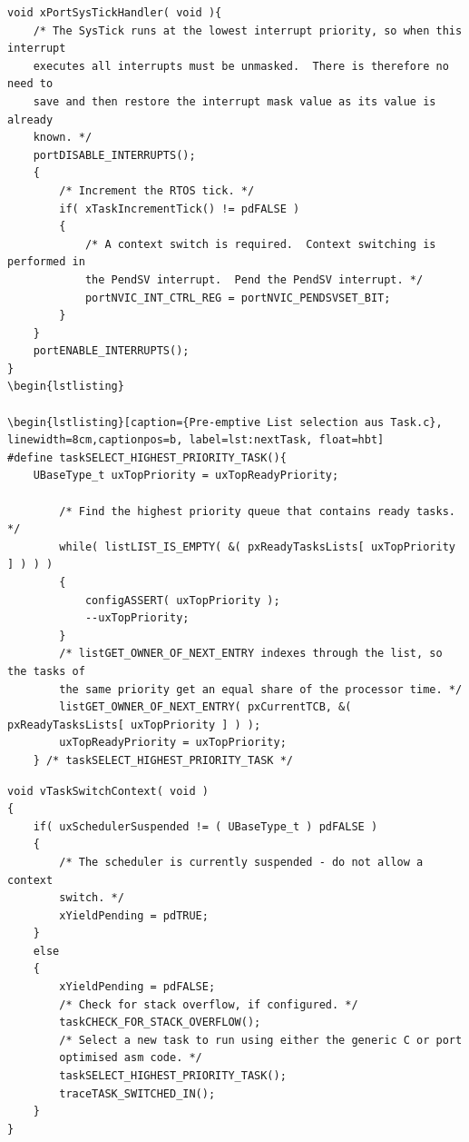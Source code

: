 \begin{lstlisting}[caption={Implementierung von SysTick aus Task.c}, linewidth=8cm,captionpos=b, label=lst:SysTickS, float=hbt]
void xPortSysTickHandler( void ){
	/* The SysTick runs at the lowest interrupt priority, so when this interrupt
	executes all interrupts must be unmasked.  There is therefore no need to
	save and then restore the interrupt mask value as its value is already
	known. */
	portDISABLE_INTERRUPTS();
	{
		/* Increment the RTOS tick. */
		if( xTaskIncrementTick() != pdFALSE )
		{
			/* A context switch is required.  Context switching is performed in
			the PendSV interrupt.  Pend the PendSV interrupt. */
			portNVIC_INT_CTRL_REG = portNVIC_PENDSVSET_BIT;
		}
	}
	portENABLE_INTERRUPTS();
}
\begin{lstlisting}

\begin{lstlisting}[caption={Pre-emptive List selection aus Task.c}, linewidth=8cm,captionpos=b, label=lst:nextTask, float=hbt]
#define taskSELECT_HIGHEST_PRIORITY_TASK(){																									
	UBaseType_t uxTopPriority = uxTopReadyPriority;														
																										
		/* Find the highest priority queue that contains ready tasks. */								
		while( listLIST_IS_EMPTY( &( pxReadyTasksLists[ uxTopPriority ] ) ) )							
		{																								
			configASSERT( uxTopPriority );																
			--uxTopPriority;																			
		}																								
		/* listGET_OWNER_OF_NEXT_ENTRY indexes through the list, so the tasks of						
		the	same priority get an equal share of the processor time. */									
		listGET_OWNER_OF_NEXT_ENTRY( pxCurrentTCB, &( pxReadyTasksLists[ uxTopPriority ] ) );			
		uxTopReadyPriority = uxTopPriority;																
	} /* taskSELECT_HIGHEST_PRIORITY_TASK */
\end{lstlisting}

\begin{lstlisting}[caption={Implementierung von Kontextwechsel aus Task.c}, linewidth=8cm,captionpos=b, label=lst:taskSwitch, float=hbt]
void vTaskSwitchContext( void )
{
	if( uxSchedulerSuspended != ( UBaseType_t ) pdFALSE )
	{
		/* The scheduler is currently suspended - do not allow a context
		switch. */
		xYieldPending = pdTRUE;
	}
	else
	{
		xYieldPending = pdFALSE;
		/* Check for stack overflow, if configured. */
		taskCHECK_FOR_STACK_OVERFLOW();
		/* Select a new task to run using either the generic C or port
		optimised asm code. */
		taskSELECT_HIGHEST_PRIORITY_TASK();
		traceTASK_SWITCHED_IN();
	}
}
\end{lstlisting}



